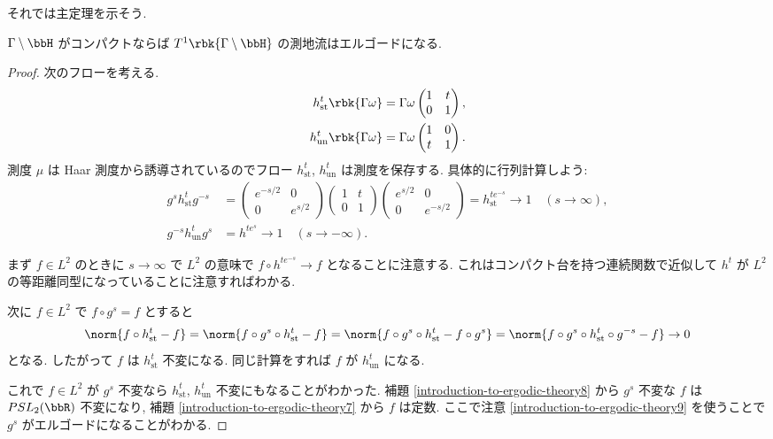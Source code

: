\documentclass[openany, a4paper, oneside]{jsbook}
\begin{document}
それでは主定理を示そう.
\begin{thm}\label{introduction-to-ergodic-theory17}
$\Gamma \setminus \bbH$ がコンパクトならば $T^1 \rbk{\Gamma \setminus \bbH}$ の測地流はエルゴードになる.
\end{thm}
\begin{proof}
次のフローを考える.
\begin{align}
 h^t_{\mathrm{st}} \rbk{\Gamma \omega}
 &=
 \Gamma \omega
 \begin{pmatrix}
  1 & t \\
  0 & 1
 \end{pmatrix}, \\
 h^t_{\mathrm{un}} \rbk{\Gamma \omega}
 &=
 \Gamma \omega
 \begin{pmatrix}
  1 & 0 \\
  t & 1
 \end{pmatrix}.
\end{align}
測度 $\mu$ は Haar 測度から誘導されているのでフロー $h^t_{\mathrm{st}}$, $h^t_{\mathrm{un}}$ は測度を保存する.
具体的に行列計算しよう:
\begin{align}
 g^s h^t_{\mathrm{st}} g^{-s}
 &=
 \begin{pmatrix}
  e^{-s/2} & 0 \\
  0        & e^{s/2}
 \end{pmatrix}
 \begin{pmatrix}
  1 & t \\
  0 & 1
 \end{pmatrix}
 \begin{pmatrix}
  e^{s/2} & 0 \\
  0       & e^{-s/2}
 \end{pmatrix}
 =
 h^{t e^{-s}}_{\mathrm{st}}
 \to
 1 \quad (s \to \infty), \\
 g^{-s} h^t_{\mathrm{un}} g^{s}
 &=
 h^{t e^s}
 \to
 1 \quad (s \to - \infty).
\end{align}

まず $f \in L^2$ のときに $s \to \infty$ で $L^2$ の意味で $f \circ h^{t e^{-s}} \to f$ となることに注意する.
これはコンパクト台を持つ連続関数で近似して $h^t$ が $L^2$ の等距離同型になっていることに注意すればわかる.

次に $f \in L^2$ で $f \circ g^s = f$ とすると
\begin{align}
 \norm{f \circ h^t_{\mathrm{st}} - f}
 =
 \norm{f \circ g^s \circ h^t_{\mathrm{st}} - f}
 =
 \norm{f \circ g^s \circ h^t_{\mathrm{st}} - f \circ g^{s}}
 =
 \norm{f \circ g^s \circ h^t_{\mathrm{st}} \circ g^{-s} - f}
 \to 0
\end{align}
となる.
したがって $f$ は $h^t_{\mathrm{st}}$ 不変になる.
同じ計算をすれば $f$ が $h^t_{\mathrm{un}}$ になる.

これで $f \in L^2$ が $g^s$ 不変なら $h^t_{\mathrm{st}}$, $h^t_{\mathrm{un}}$ 不変にもなることがわかった.
補題 \ref{introduction-to-ergodic-theory8} から $g^s$ 不変な $f$ は $PSL_2 (\bbR)$ 不変になり,
補題 \ref{introduction-to-ergodic-theory7} から $f$ は定数.
ここで注意 \ref{introduction-to-ergodic-theory9} を使うことで $g^s$ がエルゴードになることがわかる.
\end{proof}
\end{document}
